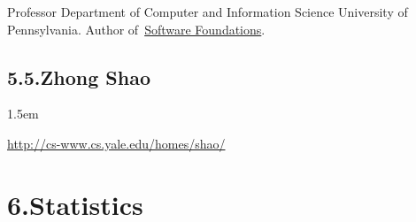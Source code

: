 \documentclass[12pt,twoside]{article}
\begin{document}
\noindent{}Professor Department of Computer and Information Science University of Pennsylvania.
Author of~\href{http://www.cis.upenn.edu/~bcpierce/sf}{Software Foundations}.%

\subsection{5.5.\hspace*{0.5em}Zhong Shao}\label{sec-zhong-shao}%

\begin{mddefinitions}%


\begin{mdbmarginx}{}{}{}{1.5em}%
\begin{mddefdata}%
\href{http://cs-www.cs.yale.edu/homes/shao/}{{\ttfamily http://\hspace{0pt}cs-\hspace{0pt}www.\hspace{0pt}cs.\hspace{0pt}yale.\hspace{0pt}edu/\hspace{0pt}homes/\hspace{0pt}shao/\hspace{0pt}}}%
\end{mddefdata}%
\end{mdbmarginx}%
\end{mddefinitions}%

\section{6.\hspace*{0.5em}Statistics}\label{sec-statistics}%
\end{document}
